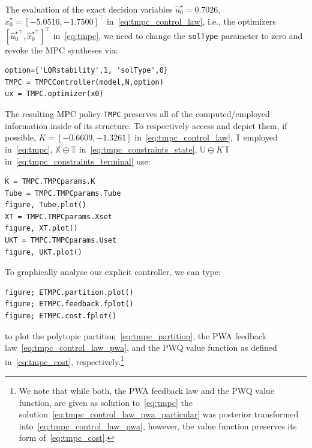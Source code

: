 \documentclass[letterpaper, 10 pt, conference]{ieeeconf}
\begin{document}
The evaluation of the exact decision variables $\hat{u}_{0}^{\star} = 0.7026$, $\hat{x}_{0}^{\star} = [-5.0516, -1.7500]^{\top}$ in~\eqref{eq:tmpc_control_law}, i.e., the optimizers $\left[ \hat{u}_{0}^{\star\top}, \hat{x}_{0}^{\star\top} \right]^{\top}$ in~\eqref{eq:tmpc}, we need to change the \texttt{solType} parameter to zero and revoke the MPC syntheses via:
\begin{verbatim}
option={'LQRstability',1, 'solType',0}
TMPC = TMPCController(model,N,option)
ux = TMPC.optimizer(x0)
\end{verbatim}
The resulting MPC policy \texttt{TMPC} preserves all of the computed/employed information inside of its structure. To respectively access and depict them, if possible, $K = [-0.6609, -1.3261]$ in~\eqref{eq:tmpc_control_law}, $\mathbb{T}$ employed in~\eqref{eq:tmpc}, $\mathbb{X} \ominus \mathbb{T}$ in~\eqref{eq:tmpc_constraints_state}, $\mathbb{U} \ominus K \, \mathbb{T}$ in~\eqref{eq:tmpc_constraints_terminal} use:
\begin{verbatim}
K = TMPC.TMPCparams.K
Tube = TMPC.TMPCparams.Tube
figure, Tube.plot()
XT = TMPC.TMPCparams.Xset
figure, XT.plot()
UKT = TMPC.TMPCparams.Uset
figure, UKT.plot()
\end{verbatim}

To graphically analyse our explicit controller, we can type:
\begin{verbatim}
figure; ETMPC.partition.plot()
figure; ETMPC.feedback.fplot()
figure; ETMPC.cost.fplot()
\end{verbatim}
to plot the polytopic partition~\eqref{eq:tmpc_partition}, the PWA feedback law~\eqref{eq:tmpc_control_law_pwa}, and the PWQ value function as defined in~\eqref{eq:tmpc_cost}, respectively.\footnote{We note that while both, the PWA feedback law and the PWQ value function, are given as solution to~\eqref{eq:tmpc} the solution~\eqref{eq:tmpc_control_law_pwa_particular} was posterior transformed into~\eqref{eq:tmpc_control_law_pwa}, however, the value function preserves its form of~\eqref{eq:tmpc_cost}.}
\end{document}
